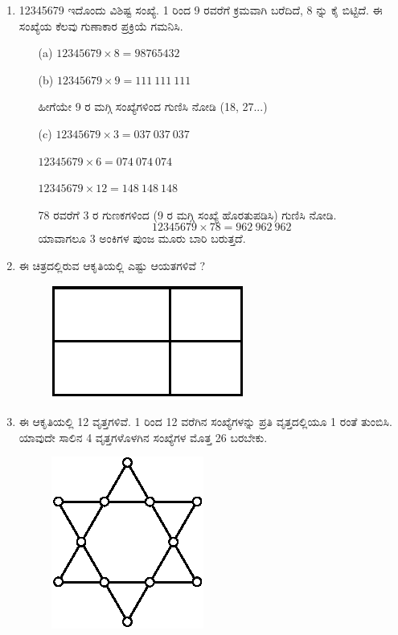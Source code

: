 \begin{enumerate}
\item 12345679 ಇದೊಂದು ವಿಶಿಷ್ಟ ಸಂಖ್ಯೆ. 1 ರಿಂದ 9 ರವರೆಗೆ ಕ್ರಮವಾಗಿ ಬರೆದಿದೆ, 8 ನ್ನು ಕೈ ಬಿಟ್ಟಿದೆ. ಈ ಸಂಖ್ಯೆಯ ಕೆಲವು ಗುಣಾಕಾರ ಪ್ರಕ್ರಿಯೆ ಗಮನಿಸಿ.
\begin{itemize}
\itemsep=4pt
\item[(a)] $12345679\times 8 = 98765432$

\item[(b)] $12345679\times 9 = 111 \ 111 \ 111$

ಹೀಗೆಯೇ 9 ರ ಮಗ್ಗಿ ಸಂಖ್ಯೆಗಳಿಂದ ಗುಣಿಸಿ ನೋಡಿ (18, 27...)

\item[(c)] $12345679\times 3 = 037 \ 037 \ 037$


$12345679 \times 6 = 074 \ 074 \ 074$


$12345679 \times 12 = 148 \ 148 \ 148$


78 ರವರೆಗೆ 3 ರ ಗುಣಕಗಳಿಂದ (9 ರ ಮಗ್ಗಿ ಸಂಖ್ಯೆ ಹೊರತುಪಡಿಸಿ) ಗುಣಿಸಿ ನೋಡಿ.
$$
12345679\times 78 = 962 \ 962 \ 962
$$ 
ಯಾವಾಗಲೂ 3 ಅಂಕಿಗಳ ಪುಂಜ ಮೂರು ಬಾರಿ ಬರುತ್ತದೆ.
\end{itemize}

\item ಈ ಚಿತ್ರದಲ್ಲಿರುವ ಆಕೃತಿಯಲ್ಲಿ ಎಷ್ಟು ಆಯತಗಳಿವೆ ?
\begin{figure}[!ht]
\centering
\includegraphics{images/chap1/q16.eps}
\end{figure}

\eject

\item ಈ ಆಕೃತಿಯಲ್ಲಿ 12 ವೃತ್ತಗಳಿವೆ. 1 ರಿಂದ 12 ವರೆಗಿನ ಸಂಖ್ಯೆಗಳನ್ನು ಪ್ರತಿ ವೃತ್ತದಲ್ಲಿಯೂ 1 ರಂತೆ ತುಂಬಿಸಿ. ಯಾವುದೇ ಸಾಲಿನ 4 ವೃತ್ತಗಳೊಳಗಿನ ಸಂಖ್ಯೆಗಳ ಮೊತ್ತ 26 ಬರಬೇಕು.
\begin{figure}[!ht]
\centering
\includegraphics[scale=.8]{images/chap1/q17.eps}
\end{figure}


\end{enumerate}
